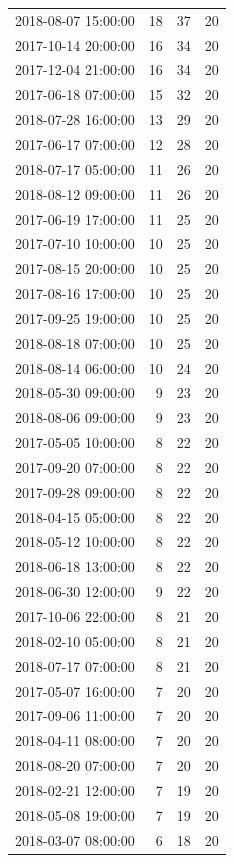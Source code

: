 \begin{tabular}{lrrr}
2018-08-07 15:00:00 & 18 & 37 & 20 \\
2017-10-14 20:00:00 & 16 & 34 & 20 \\
2017-12-04 21:00:00 & 16 & 34 & 20 \\
2017-06-18 07:00:00 & 15 & 32 & 20 \\
2018-07-28 16:00:00 & 13 & 29 & 20 \\
2017-06-17 07:00:00 & 12 & 28 & 20 \\
2018-07-17 05:00:00 & 11 & 26 & 20 \\
2018-08-12 09:00:00 & 11 & 26 & 20 \\
2017-06-19 17:00:00 & 11 & 25 & 20 \\
2017-07-10 10:00:00 & 10 & 25 & 20 \\
2017-08-15 20:00:00 & 10 & 25 & 20 \\
2017-08-16 17:00:00 & 10 & 25 & 20 \\
2017-09-25 19:00:00 & 10 & 25 & 20 \\
2018-08-18 07:00:00 & 10 & 25 & 20 \\
2018-08-14 06:00:00 & 10 & 24 & 20 \\
2018-05-30 09:00:00 & 9 & 23 & 20 \\
2018-08-06 09:00:00 & 9 & 23 & 20 \\
2017-05-05 10:00:00 & 8 & 22 & 20 \\
2017-09-20 07:00:00 & 8 & 22 & 20 \\
2017-09-28 09:00:00 & 8 & 22 & 20 \\
2018-04-15 05:00:00 & 8 & 22 & 20 \\
2018-05-12 10:00:00 & 8 & 22 & 20 \\
2018-06-18 13:00:00 & 8 & 22 & 20 \\
2018-06-30 12:00:00 & 9 & 22 & 20 \\
2017-10-06 22:00:00 & 8 & 21 & 20 \\
2018-02-10 05:00:00 & 8 & 21 & 20 \\
2018-07-17 07:00:00 & 8 & 21 & 20 \\
2017-05-07 16:00:00 & 7 & 20 & 20 \\
2017-09-06 11:00:00 & 7 & 20 & 20 \\
2018-04-11 08:00:00 & 7 & 20 & 20 \\
2018-08-20 07:00:00 & 7 & 20 & 20 \\
2018-02-21 12:00:00 & 7 & 19 & 20 \\
2018-05-08 19:00:00 & 7 & 19 & 20 \\
2018-03-07 08:00:00 & 6 & 18 & 20 \\

\end{tabular}
